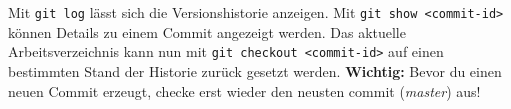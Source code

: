 Mit \lstinline|git log| lässt sich die Versionshistorie anzeigen. Mit \lstinline|git show <commit-id>| können Details zu einem Commit angezeigt werden. Das aktuelle Arbeitsverzeichnis kann nun mit \lstinline|git checkout <commit-id>| auf einen bestimmten Stand der Historie zurück gesetzt werden.
\textbf{Wichtig:} Bevor du einen neuen Commit erzeugt, checke erst wieder den neusten commit (\textit{master}) aus!
